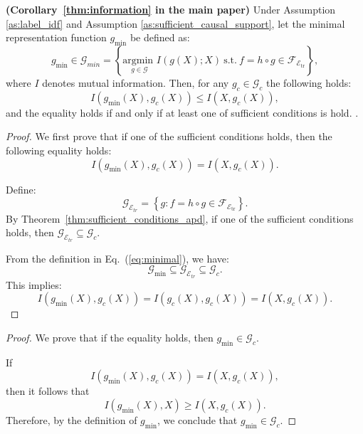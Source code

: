 

\begin{corollary} \textbf{(Corollary~\ref{thm:information} in the main paper)} Under Assumption \ref{as:label_idf} and Assumption \ref{as:sufficient_causal_support}, let the minimal representation function $g_{\text{min}}$ be defined as:
\begin{equation}
g_{\text{min}} \in \mathcal{G}_{min}=\left\{\underset{g \in \mathcal{G}}{\text{argmin }} I(g(X); X) \ \text{s.t.} \ f = h \circ g \in \mathcal{F}_{\mathcal{E}_{\text{tr}}} \right\},
\label{eq:minimal}
\end{equation}
where $I$ denotes mutual information. Then, for any $g_c\in \mathcal{G}_c$ the following holds:
\begin{equation}
I(g_{\text{min}}(X), g_c(X)) \leq I(X, g_c(X)),
\end{equation}
and the equality holds if and only if at least one of sufficient conditions is hold.
\label{thm:information_apd}.
\end{corollary}

\begin{proof} We first prove that if one of the sufficient conditions holds, then the following equality holds:
\[
I(g_{\text{min}}(X), g_c(X)) = I(X, g_c(X)).
\]

Define:
\begin{equation*}
\mathcal{G}_{\mathcal{E}_{tr}}=\left \{g: f = h \circ g \in \mathcal{F}_{\mathcal{E}_{\text{tr}}} \right\}.
\end{equation*}
By Theorem~\ref{thm:sufficient_conditions_apd}, if one of the sufficient conditions holds, then \( \mathcal{G}_{\mathcal{E}_{tr}} \subseteq \mathcal{G}_c \).

From the definition in Eq.~(\ref{eq:minimal}), we have:
\[
\mathcal{G}_{\text{min}} \subseteq \mathcal{G}_{\mathcal{E}_{tr}} \subseteq \mathcal{G}_c.
\]
This implies:
\[
I(g_{\text{min}}(X), g_c(X)) = I(g_c(X), g_c(X)) = I(X, g_c(X)).
\]
\end{proof}

\begin{proof} We prove that if the equality holds, then \( g_{\text{min}} \in \mathcal{G}_c \).

If
\[
I(g_{\text{min}}(X), g_c(X)) = I(X, g_c(X)),
\]
then it follows that
\[
I(g_{\text{min}}(X), X) \geq I(X, g_c(X)).
\]
Therefore, by the definition of \( g_{\text{min}} \), we conclude that \( g_{\text{min}} \in \mathcal{G}_c \).

\end{proof}

